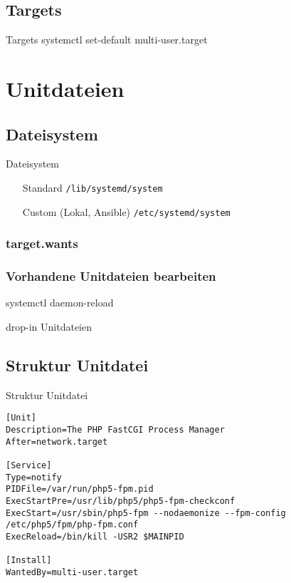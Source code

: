 \subsection{Targets}

\begin{frame}{Targets}
 systemctl set-default multi-user.target
\end{frame}

\section{Unitdateien}

\subsection{Dateisystem}

\begin{frame}[fragile]{Dateisystem}
  \begin{itemize}
\item[Standard] \verb|/lib/systemd/system|
\item[Custom] (Lokal, Ansible) \verb|/etc/systemd/system|
\end{itemize}
\end{frame}

\subsubsection{target.wants}

\subsubsection{Vorhandene Unitdateien bearbeiten}


 systemctl daemon-reload

 drop-in Unitdateien
 \subsection{Struktur Unitdatei}

\begin{frame}[fragile]{Struktur Unitdatei}
 \begin{lstlisting}
[Unit]
Description=The PHP FastCGI Process Manager
After=network.target

[Service]
Type=notify
PIDFile=/var/run/php5-fpm.pid
ExecStartPre=/usr/lib/php5/php5-fpm-checkconf
ExecStart=/usr/sbin/php5-fpm --nodaemonize --fpm-config /etc/php5/fpm/php-fpm.conf
ExecReload=/bin/kill -USR2 $MAINPID

[Install]
WantedBy=multi-user.target
\end{lstlisting}
\end{frame}

